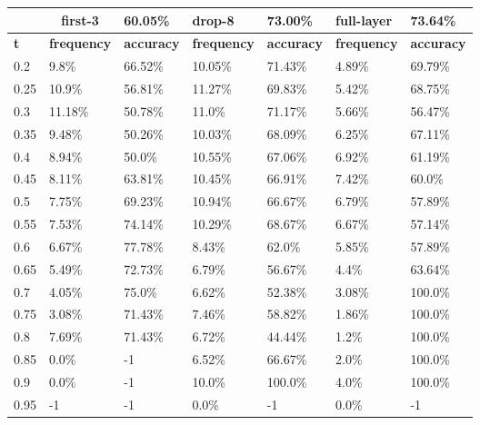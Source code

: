 
\begin{table}[t]
\centering
\begin{tabular}{lllllll}
\hline
\multicolumn{1}{c}{} & \multicolumn{1}{c}{first-3} & \multicolumn{1}{l|}{60.05\%} & drop-8 & \multicolumn{1}{l|}{73.00\%} & full-layer & 73.64\% \\ \hline
\multicolumn{1}{l|}{\textbf{t}} & \textbf{frequency} & \multicolumn{1}{l|}{\textbf{accuracy}} & \textbf{frequency} & \multicolumn{1}{l|}{\textbf{accuracy}} & \textbf{frequency} & \textbf{accuracy} \\ \hline	\multicolumn{1}{l|}{0.2}&  9.8\% & \multicolumn{1}{l|}{66.52\%}& 10.05\% & \multicolumn{1}{l|}{71.43\%}& 4.89\% & 69.79\%\\ 
\multicolumn{1}{l|}{0.25}&  10.9\% & \multicolumn{1}{l|}{56.81\%}& 11.27\% & \multicolumn{1}{l|}{69.83\%}& 5.42\% & 68.75\%\\ 
\multicolumn{1}{l|}{0.3}&  11.18\% & \multicolumn{1}{l|}{50.78\%}& 11.0\% & \multicolumn{1}{l|}{71.17\%}& 5.66\% & 56.47\%\\ 
\multicolumn{1}{l|}{0.35}&  9.48\% & \multicolumn{1}{l|}{50.26\%}& 10.03\% & \multicolumn{1}{l|}{68.09\%}& 6.25\% & 67.11\%\\ 
\multicolumn{1}{l|}{0.4}&  8.94\% & \multicolumn{1}{l|}{50.0\%}& 10.55\% & \multicolumn{1}{l|}{67.06\%}& 6.92\% & 61.19\%\\ 
\multicolumn{1}{l|}{0.45}&  8.11\% & \multicolumn{1}{l|}{63.81\%}& 10.45\% & \multicolumn{1}{l|}{66.91\%}& 7.42\% & 60.0\%\\ 
\multicolumn{1}{l|}{0.5}&  7.75\% & \multicolumn{1}{l|}{69.23\%}& 10.94\% & \multicolumn{1}{l|}{66.67\%}& 6.79\% & 57.89\%\\ 
\multicolumn{1}{l|}{0.55}&  7.53\% & \multicolumn{1}{l|}{74.14\%}& 10.29\% & \multicolumn{1}{l|}{68.67\%}& 6.67\% & 57.14\%\\ 
\multicolumn{1}{l|}{0.6}&  6.67\% & \multicolumn{1}{l|}{77.78\%}& 8.43\% & \multicolumn{1}{l|}{62.0\%}& 5.85\% & 57.89\%\\ 
\multicolumn{1}{l|}{0.65}&  5.49\% & \multicolumn{1}{l|}{72.73\%}& 6.79\% & \multicolumn{1}{l|}{56.67\%}& 4.4\% & 63.64\%\\ 
\multicolumn{1}{l|}{0.7}&  4.05\% & \multicolumn{1}{l|}{75.0\%}& 6.62\% & \multicolumn{1}{l|}{52.38\%}& 3.08\% & 100.0\%\\ 
\multicolumn{1}{l|}{0.75}&  3.08\% & \multicolumn{1}{l|}{71.43\%}& 7.46\% & \multicolumn{1}{l|}{58.82\%}& 1.86\% & 100.0\%\\ 
\multicolumn{1}{l|}{0.8}&  7.69\% & \multicolumn{1}{l|}{71.43\%}& 6.72\% & \multicolumn{1}{l|}{44.44\%}& 1.2\% & 100.0\%\\ 
\multicolumn{1}{l|}{0.85}&  0.0\% & \multicolumn{1}{l|}{-1}& 6.52\% & \multicolumn{1}{l|}{66.67\%}& 2.0\% & 100.0\%\\ 
\multicolumn{1}{l|}{0.9}&  0.0\% & \multicolumn{1}{l|}{-1}& 10.0\% & \multicolumn{1}{l|}{100.0\%}& 4.0\% & 100.0\%\\ 
\multicolumn{1}{l|}{0.95}&  -1 & \multicolumn{1}{l|}{-1}& 0.0\% & \multicolumn{1}{l|}{-1}& 0.0\% & -1\\ 


\end{tabular}
\end{table}
